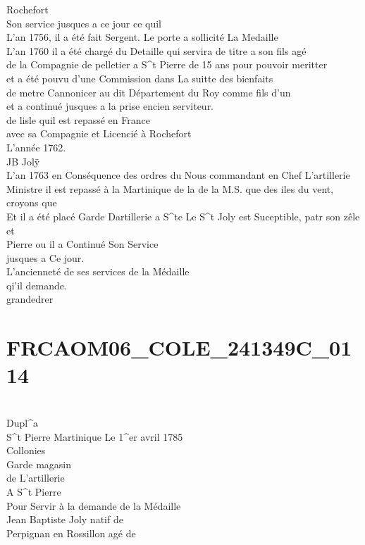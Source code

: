 \documentclass{article}
\begin{document}
\begin{pages}
Rochefort\\
Son service jusques a ce jour ce quil\\
L'an 1756, il a été fait Sergent. Le porte a sollicité La Medaille\\
L'an 1760 il a été chargé du Detaille qui servira de titre a son fils agé\\
de la Compagnie de pelletier a S\^{}t Pierre de 15 ans pour pouvoir meritter\\
et a été pouvu d'une Commission dans La suitte des bienfaits\\
de metre Cannonicer au dit Département du Roy comme fils d'un\\
et a continué jusques a la prise encien serviteur.\\
de lisle quil est repassé en France\\
avec sa Compagnie et Licencié à Rochefort\\
L'année 1762.\\
JB Jolÿ\\
L'an 1763 en Conséquence des ordres du Nous commandant en Chef L'artillerie\\
Ministre il est repassé à la Martinique de la de la M.S. que des iles du vent, croyons que\\
Et il a été placé Garde Dartillerie a S\^{}te Le S\^{}t Joly est Suceptible, patr son zêle et\\
Pierre ou il a Continué Son Service\\
jusques a Ce jour.\\
L'ancienneté de ses services de la Médaille\\
qi'il demande.\\
grandedrer
\pend
\endnumbering\beginnumbering\section{FRCAOM06\_COLE\_241349C\_0114}\pstart
\\
Dupl\^{}a\\
S\^{}t Pierre Martinique Le 1\^{}er avril 1785\\
Collonies\\
Garde magasin\\
de L'artillerie\\
A S\^{}t Pierre\\
Pour Servir à la demande de la Médaille\\
Jean Baptiste Joly natif de
\pend\pstart
\\
Perpignan en Rossillon agé de\\

\end{pages}
\end{document}
